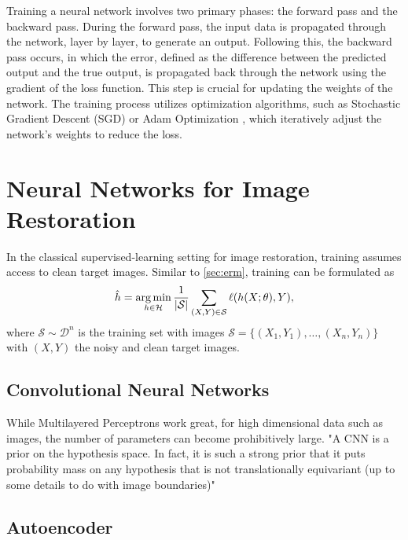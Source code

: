 Training a neural network involves two primary phases: the forward pass and the backward pass. During the forward pass, the input data is propagated through the network, layer by layer, to generate an output. Following this, the backward pass occurs, in which the error, defined as the difference between the predicted output and the true output, is propagated back through the network using the gradient of the loss function. This step is crucial for updating the weights of the network.
The training process utilizes optimization algorithms, such as Stochastic Gradient Descent (SGD) \cite{sutskeverImportanceInitializationMomentum2013} or Adam Optimization \cite{kingmaAdamMethodStochastic2017}, which iteratively adjust the network's weights to reduce the loss.

\section{Neural Networks for Image Restoration}
In the classical supervised-learning setting for image restoration, training assumes access to clean target images. Similar to \cref{sec:erm}, training can be formulated as
\begin{equation}
    \hat{h} = \operatorname*{arg\,min}_{h \in \mathcal{H}} \frac{1}{\lvert \mathcal{S} \rvert} \sum_{(X, Y) \in \mathcal{S}} \ell(h(X; \theta), Y),
\end{equation}
where $\mathcal{S} \sim \mathcal{D}^n$ is the training set with images $\mathcal{S} = \{(X_1, Y_1), \dots, (X_n, Y_n)\}$ with $(X, Y)$  the noisy and clean target images.

\subsection{Convolutional Neural Networks}
While Multilayered Perceptrons work great, for high dimensional data such as images, the number of parameters can become prohibitively large. 
"A CNN is a prior on the hypothesis space. In fact, it is such a strong prior that it puts 
 probability mass on any hypothesis that is not translationally equivariant (up to some details to do with image boundaries)"

\subsection{Autoencoder}
\cite{goodfellowDeepLearning2016}
